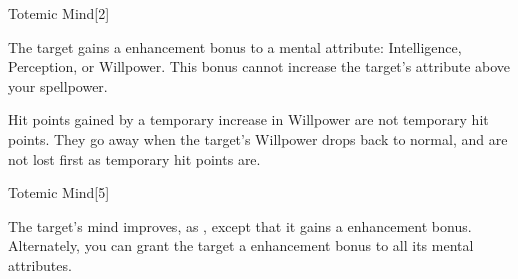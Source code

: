 \begin{spellsection}{Totemic Mind}[2]
    \begin{spellheader}
    \end{spellheader}
    \begin{spellcontent}
        \begin{spelltargetinginfo}
        \end{spelltargetinginfo}
        \begin{spelleffects}
            \spelleffect The target gains a  enhancement bonus to a mental attribute: Intelligence, Perception, or Willpower. This bonus cannot increase the target's attribute above your spellpower.
            \spelldur \durpersonallong
        \end{spelleffects}
    \end{spellcontent}
    \begin{spellfooter}
        \spellnotes Hit points gained by a temporary increase in Willpower are not temporary hit points. They go away when the target's Willpower drops back to normal, and are not lost first as temporary hit points are.
    \end{spellfooter}
\end{spellsection}

\begin{spellsection}[Greater]{Totemic Mind}[5]
    \begin{spellheader}
    \end{spellheader}
    \begin{spellcontent}
        \begin{spelltargetinginfo}
        \end{spelltargetinginfo}
        \begin{spelleffects}
            \spelleffect The target's mind improves, as , except that it gains a  enhancement bonus. Alternately, you can grant the target a  enhancement bonus to all its mental attributes.
            \spelldur \durpersonallong
        \end{spelleffects}
    \end{spellcontent}
    \begin{spellfooter}
    \end{spellfooter}
\end{spellsection}

